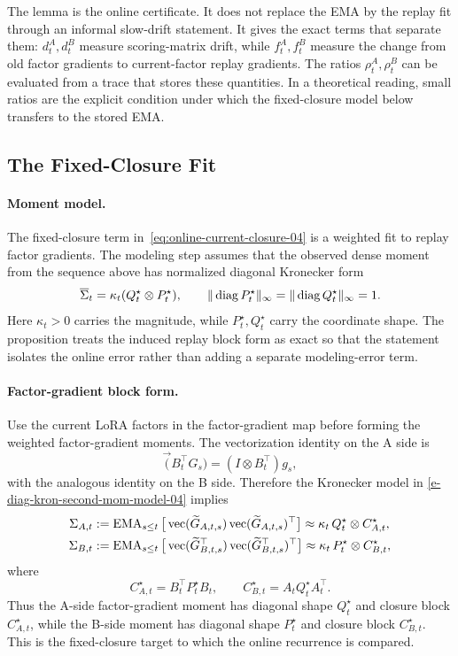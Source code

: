 The lemma is the online certificate. It does not replace the EMA by the replay
fit through an informal slow-drift statement. It gives the exact terms that
separate them: $d^A_t,d^B_t$ measure scoring-matrix drift, while
$f^A_t,f^B_t$ measure the change from old factor gradients to current-factor
replay gradients. The ratios $\rho^A_t,\rho^B_t$ can be evaluated from a trace
that stores these quantities. In a theoretical reading, small ratios are the
explicit condition under which the fixed-closure model below transfers to the
stored EMA.

\subsection{The Fixed-Closure Fit}
\label{sec:fixed-closure-comparator-04}

\paragraph{Moment model.}
The fixed-closure term in~\eqref{eq:online-current-closure-04} is a weighted fit to
replay factor gradients. The modeling step assumes that the observed dense
moment from the sequence above has normalized diagonal Kronecker form
\begin{equation}\label{e-diag-kron-second-mom-model-04}
  \overline\Sigma_t
  =
  \kappa_t(Q^\star_t\otimes P^\star_t),
  \qquad
  \| \operatorname{diag} P^\star_t\|_\infty
  =
  \| \operatorname{diag} Q^\star_t\|_\infty
  =
  1 .
\end{equation}
Here $\kappa_t>0$ carries the magnitude, while $P^\star_t,Q^\star_t$ carry the
coordinate shape. The proposition treats the induced replay block form as exact
so that the statement isolates the online error rather than adding a separate
modeling-error term.

\paragraph{Factor-gradient block form.}
Use the current LoRA factors in the factor-gradient map before forming the
weighted factor-gradient moments. The vectorization identity on the A side is
\[
  \vec(B_t^\top G_s)=(I\otimes B_t^\top)g_s ,
\]
with the analogous identity on the B side. Therefore the Kronecker model in
\eqref{e-diag-kron-second-mom-model-04} implies
\begin{align}
  \Sigma_{A,t}
  &:=
  \operatorname{EMA}_{s\leq t}
  \big[\operatorname{vec}(\widetilde G_{A,t,s})
       \operatorname{vec}(\widetilde G_{A,t,s})^\top\big]
  \approx
  \kappa_t\,Q^\star_t\otimes C^\star_{A,t},
  \nonumber\\
  \Sigma_{B,t}
  &:=
  \operatorname{EMA}_{s\leq t}
  \big[\operatorname{vec}(\widetilde G_{B,t,s}^\top)
       \operatorname{vec}(\widetilde G_{B,t,s}^\top)^\top\big]
  \approx
  \kappa_t\,P^\star_t\otimes C^\star_{B,t},
  \label{eq:observable-moments-04}
\end{align}
where
\[
  C^\star_{A,t}=B_t^\top P^\star_tB_t,
  \qquad
  C^\star_{B,t}=A_tQ^\star_tA_t^\top .
\]
Thus the A-side factor-gradient moment has diagonal shape $Q^\star_t$ and
closure block $C^\star_{A,t}$, while the B-side moment has diagonal shape
$P^\star_t$ and closure block $C^\star_{B,t}$. This is the fixed-closure target
to which the online recurrence is compared.


